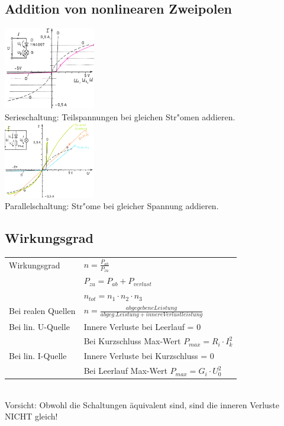 \subsection{Addition von nonlinearen Zweipolen}
\begin{multicols}{2}
\includegraphics[width=0.3\textwidth]{pics/kennlinien/nonlinAddPar}\\
Serieschaltung: Teilspannungen bei gleichen Str"omen addieren.\\
\includegraphics[width=0.3\textwidth]{pics/kennlinien/nonlinAddSer}\\
Parallelschaltung: Str"ome bei gleicher Spannung addieren.\\
\end{multicols}

\subsection{Wirkungsgrad}
\begin{tabular}{ll}
Wirkungsgrad & $n = \frac{P_{ab}}{P_{zu}}$ \\
& $ P_{zu} = P_{ab}+P_{verlust} $\\
& $ n_{tot} = n_1 \cdot n_2 \cdot n_3 $\\
Bei realen Quellen & $n = \frac{abgegebene Leistung}{abgeg. Leistung + innere Verlustleistung}$\\
Bei lin. U-Quelle & Innere Verluste bei Leerlauf = 0\\
& Bei Kurzschluss Max-Wert $P_{max} = R_i \cdot I_k^2$\\
Bei lin. I-Quelle & Innere Verluste bei Kurzschluss = 0\\
& Bei Leerlauf Max-Wert $P_{max} = G_i \cdot U_0^2$\\
\end{tabular}\\
Vorsicht: Obwohl die Schaltungen äquivalent sind, sind die inneren Verluste NICHT gleich!

